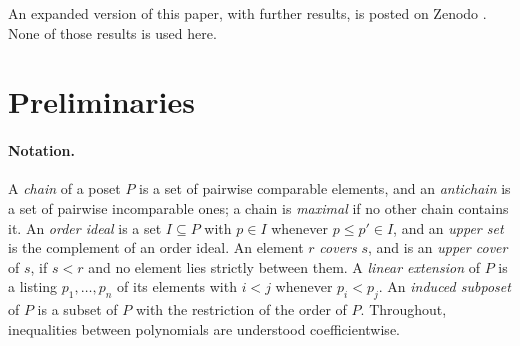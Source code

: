 \documentclass[11pt]{article}
\theoremstyle{definition}
\theoremstyle{remark}
\begin{document}
An expanded version of this paper, with further results, is posted
on Zenodo \cite{G}. None of those results is used here.

\section{Preliminaries}\label{sec:defs}
\paragraph{Notation.} A \emph{chain} of a poset $P$ is a set of pairwise comparable elements, and an
\emph{antichain} is a set of pairwise incomparable ones; a chain is \emph{maximal} if no other chain
contains it. An \emph{order ideal} is a set $I\subseteq P$ with $p\in I$ whenever $p\leq p'\in I$, and
an \emph{upper set} is the complement of an order ideal. An element $r$ \emph{covers} $s$, and is an
\emph{upper cover} of $s$, if $s<r$ and no element lies strictly between them. A \emph{linear
extension} of $P$ is a listing $p_1,\ldots,p_n$ of its elements with $i<j$ whenever $p_i<p_j$. An \emph{induced subposet} of $P$ is a subset of $P$ with the restriction of the order of $P$. Throughout, inequalities between polynomials are understood coefficientwise.
\end{document}
